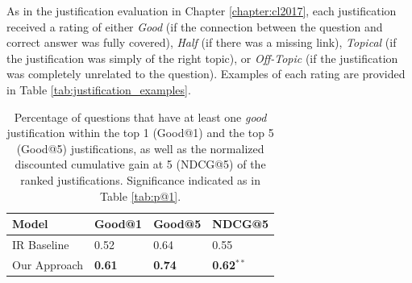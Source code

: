 As in the justification evaluation in Chapter \ref{chapter:cl2017}, each justification received a rating of either \emph{Good} (if the connection between the question and correct answer was fully covered), \emph{Half} (if there was a missing link), \emph{Topical} (if the justification was simply of the right topic), or \emph{Off-Topic} (if the justification was completely unrelated to the question). Examples of each rating are provided in Table \ref{tab:justification_examples}.  

\begin{table}[t]
\begin{center}
\begin{tabular}{llll}
\hline
 Model 			& Good@1 	& Good@5 	& NDCG@5 \\ 
\hline
IR Baseline 	&	0.52 		&	0.64 		& 0.55 \\
Our Approach & 	{\bf 0.61}	 	&	{\bf 0.74}			& {\bf 0.62}$^{**}$ \\
\end{tabular}
\caption{{Percentage of questions that have at least one \emph{good} justification within the top 1 (Good@1) and the top 5 (Good@5) justifications, 
as well as the normalized discounted cumulative gain at 5 (NDCG@5) of the ranked justifications.
 Significance indicated as in Table \ref{tab:p@1}.
}} 
\label{tab:justification_ndcg}
\end{center}
\end{table}




